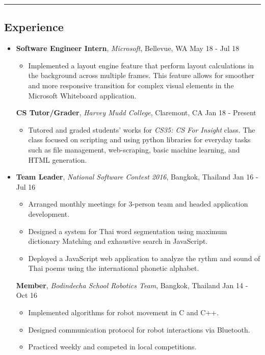 \documentclass[10.5pt,letterpaper]{article}
\begin{document}
\hrule
\vspace{-1.0em}
\subsection*{Experience}
  \begin{itemize}
    \parskip=-0.2em
    
    \item[]
    {\textbf{Software Engineer Intern}, \textit{Microsoft}, Bellevue, WA \hfill {May 18 - Jul 18}}
    \begin{itemize}[label=\textbullet]
      \itemsep0em
      \item Implemented a layout engine feature that perform layout calculations in the background across multiple frames. This feature allows for smoother and more responsive transition for complex visual elements in the Microsoft Whiteboard application.
      
    \end{itemize}
    {\textbf{CS Tutor/Grader}, \textit{Harvey Mudd College}, Claremont, CA \hfill {Jan 18 - Present}}
    \begin{itemize}[label=\textbullet]
      \itemsep0em
      \item Tutored and graded students' works for \textit{CS35: CS For Insight} class. The class focused on scripting and using python libraries for everyday tasks such as file management, web-scraping, basic machine learning, and HTML generation.
      
    \end{itemize}
    
    \item[]
    {\textbf{Team Leader}, \textit{National Software Contest 2016}, Bangkok, Thailand \hfill {Jan 16 - Jul 16}}
    \begin{itemize}[label=\textbullet]
      \itemsep0em
      \item Arranged monthly meetings for 3-person team and headed application development.
      \item Designed a system for Thai word segmentation using maximum dictionary Matching and exhaustive search in JavaScript.
      \item Deployed a JavaScript web application to analyze the rythm and sound of Thai poems using the international phonetic alphabet.
      
    \end{itemize}
    
    {\textbf{Member}, \textit{Bodindecha School Robotics Team}, Bangkok, Thailand \hfill {Jan 14 - Oct 16}}
     
    \begin{itemize}[label=\textbullet]
      \itemsep0em
      \item Implemented algorithms for robot movement in C and C++.
      \item Designed communication protocol for robot interactions via Bluetooth.
      \item Practiced weekly and competed in local competitions.
      
    \end{itemize}


  \end{itemize}
  
\end{document}
